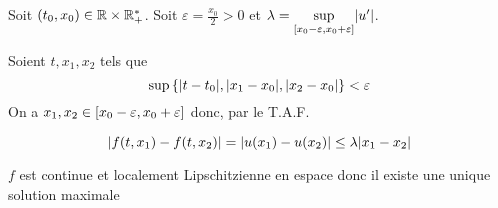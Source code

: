 {\begin{nntd-sol}[]
\begin{itemize}
			Soit \((t_0,x_0)\in\mathbb{R}\times\mathbb{R}_+^*\). Soit \(\varepsilon=\frac{x_0}{2}>0\)
			et \(\lambda=\sup\limits_{\mathopen{}\left[x_0-\varepsilon,x_0+\varepsilon\right]\mathclose{}}\mathopen{}\left|u'\right|\mathclose{}\).

			Soient \(t,x_1,x_2\) tels que
			\begin{equation*}
				\sup{\{\mathopen{}\left|t-t_0\right|\mathclose{},\mathopen{}\left|x_1-x_0\right|\mathclose{},\mathopen{}\left|x_2-x_0\right|\mathclose{}\}}<\varepsilon
			\end{equation*}
			On a \(x_1,x_2\in\mathopen{}\left[x_0-\varepsilon,x_0+\varepsilon\right]\mathclose{}\) donc, par le
			T.A.F.

			\begin{equation*}
				\mathopen{}\left|f(t,x_1)-f(t,x_2)\right|\mathclose{}=\mathopen{}\left|u(x_1)-u(x_2)\right|\mathclose{}\le \lambda \mathopen{}\left|x_1-x_2\right|\mathclose{}
			\end{equation*}

			\(f\) est continue et localement Lipschitzienne en espace donc il existe
			une unique solution maximale

		\end{itemize}
	\end{nntd-sol}
}{}

\begin{td-exo}[] %
\end{td-exo}


